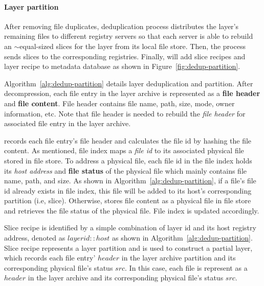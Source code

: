 \paragraph{Layer partition}
After removing file duplicates,
deduplication process distributes the layer's remaining files to different registry servers
so that each server is able to rebuild an $\sim$equal-sized slices for the layer from its local file store.
Then, the process sends slices to the corresponding registries.
Finally, \sysname will add slice recipes and layer recipe to metadata database as shown in Figure~\ref{fig:dedup-partition}.



Algorithm~\ref{alg:dedup-partition} details layer deduplication and partition.
After decompression, 
each file entry in the layer archive is represented as a \textbf{file header} and \textbf{file content}.
File header contains file name, path, size, mode, owner information, etc.
Note that file header is needed to rebuild the \emph{file header} for 
associated file entry in the layer archive.

\sysname records each file entry's file header and 
calculates the file id by hashing the file content.
As mentioned, file index maps a \emph{file id} to its associated physical file stored in file store.
To address a physical file,
each file id in the file index holds its 
\emph{host address} and \textbf{file status} of the physical file which mainly contains file name, path, and size.
As shown in Algorithm~\ref{alg:dedup-partition}, 
if a file's file id already exists in file index, 
this file will be added to its host's corresponding partition (i.e, slice). 
Otherwise,
\sysname stores file content as a physical file in file store
and retrieves the file status of the physical file.
File index is updated accordingly.

Slice recipe is identified by a simple combination of layer id and its host registry address,
denoted as $layerid::host$ as shown in Algorithm~\ref{alg:dedup-partition}.
Slice recipe represents a layer partition and
is used to construct a partial layer,
which
records each file entry' $header$ in the layer archive partition and 
its corresponding physical file's status $src$. 
In this case, 
each file is represent as a $header$ in the layer archive and
its corresponding physical file's status $src$. 



